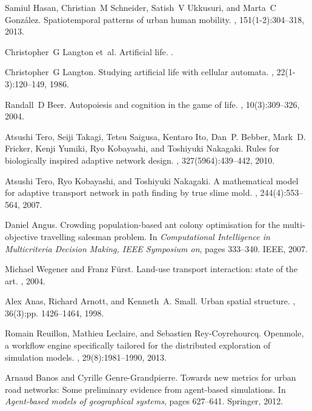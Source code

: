 \documentclass[runningheads,a4paper]{llncs}
\begin{document}
\begin{thebibliography}{10}
Samiul Hasan, Christian~M Schneider, Satish~V Ukkusuri, and Marta~C
  Gonz{\'a}lez.
\newblock Spatiotemporal patterns of urban human mobility.
, 151(1-2):304--318, 2013.

Christopher~G Langton et~al.
\newblock Artificial life.
.

Christopher~G Langton.
\newblock Studying artificial life with cellular automata.
, 22(1-3):120--149, 1986.

Randall~D Beer.
\newblock Autopoiesis and cognition in the game of life.
, 10(3):309--326, 2004.

Atsushi Tero, Seiji Takagi, Tetsu Saigusa, Kentaro Ito, Dan~P. Bebber, Mark~D.
  Fricker, Kenji Yumiki, Ryo Kobayashi, and Toshiyuki Nakagaki.
\newblock Rules for biologically inspired adaptive network design.
, 327(5964):439--442, 2010.

Atsushi Tero, Ryo Kobayashi, and Toshiyuki Nakagaki.
\newblock A mathematical model for adaptive transport network in path finding
  by true slime mold.
, 244(4):553--564, 2007.

Daniel Angus.
\newblock Crowding population-based ant colony optimisation for the
  multi-objective travelling salesman problem.
\newblock In {\em Computational Intelligence in Multicriteria Decision Making,
  IEEE Symposium on}, pages 333--340. IEEE, 2007.

Michael Wegener and Franz F{\"u}rst.
\newblock Land-use transport interaction: state of the art.
, 2004.

Alex Anas, Richard Arnott, and Kenneth~A. Small.
\newblock Urban spatial structure.
, 36(3):pp. 1426--1464, 1998.

Romain Reuillon, Mathieu Leclaire, and Sebastien Rey-Coyrehourcq.
\newblock Openmole, a workflow engine specifically tailored for the distributed
  exploration of simulation models.
, 29(8):1981--1990, 2013.

Arnaud Banos and Cyrille Genre-Grandpierre.
\newblock Towards new metrics for urban road networks: Some preliminary
  evidence from agent-based simulations.
\newblock In {\em Agent-based models of geographical systems}, pages 627--641.
  Springer, 2012.


\end{thebibliography}
\end{document}
